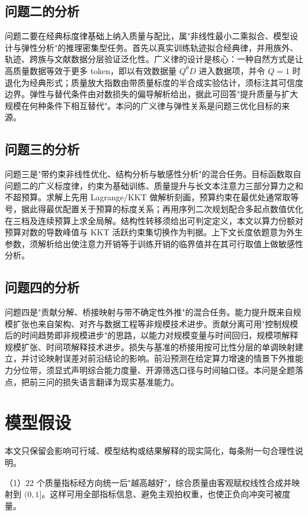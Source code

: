 \documentclass[12pt,a4paper]{ctexart}
\newcommand{\Dt}{D}
\begin{document}
\subsection{问题二的分析}
问题二要在经典标度律基础上纳入质量与配比，属"非线性最小二乘拟合、模型设计与弹性分析"的推理密集型任务。首先以真实训练轨迹拟合经典律，并用族外、轨迹、跨族与文献数据分层验证泛化性。广义律的设计是核心：一种自然方式是让高质量数据等效于更多 token，即以有效数据量 $Q^{\theta}\Dt$ 进入数据项，并令 $Q=1$ 时退化为经典形式；质量放大指数由带质量标度的半合成实验估计，须标注其可信度边界。弹性与替代条件由对数损失的偏导解析给出，据此可回答"提升质量与扩大规模在何种条件下相互替代"。本问的广义律与弹性关系是问题三优化目标的来源。

\subsection{问题三的分析}
问题三是"带约束非线性优化、结构分析与敏感性分析"的混合任务。目标函数取自问题二的广义标度律，约束为基础训练、质量提升与长文本注意力三部分算力之和不超预算。求解上先用 Lagrange/KKT 做解析刻画，预算约束在最优处通常取等号，据此得最优配置关于预算的标度关系；再用序列二次规划配合多起点数值优化\cite{sqp1995}在三档及连续预算上求全局解。结构性转移须给出可判定定义，本文以算力份额对预算对数的导数峰值与 KKT 活跃约束集切换作为判据。上下文长度依题意为外生参数，须解析给出使注意力开销等于训练开销的临界值并在其可行取值上做敏感性分析。

\subsection{问题四的分析}
问题四是"贡献分解、桥接映射与带不确定性外推"的混合任务。能力提升既来自规模扩张也来自架构、对齐与数据工程等非规模技术进步\cite{gpt3_2020,emergent2022}。贡献分离可用"控制规模后的时间趋势即非规模进步"的思路，以能力对规模变量与时间回归，规模项解释规模扩张、时间项解释技术进步。损失与基准的桥接用按可比性分层的单调映射建立，并讨论映射误差对前沿结论的影响。前沿预测在给定算力增速的情景下外推能力分位带，须显式声明综合能力度量、开源筛选口径与时间轴口径\cite{helm2022,mmlu2020}。本问是全题落点，把前三问的损失语言翻译为现实基准能力。

\section{模型假设}
本文只保留会影响可行域、模型结构或结果解释的现实简化，每条附一句合理性说明。

（1）$22$ 个质量指标经方向统一后"越高越好"，综合质量由客观赋权线性合成并映射到 $(0,1]$。这样可用全部指标信息、避免主观拍权重，也使正负向冲突可被度量。
\end{document}
